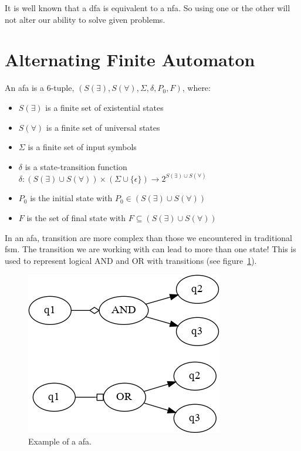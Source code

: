 \documentclass[12pt]{article}
\theoremstyle{definition}
\theoremstyle{definition}
\theoremstyle{remark}
\begin{document}
It is well known that a \gls{dfa} is equivalent to a \gls{nfa}. So using one or the other will not alter our ability to solve given problems.



\section{Alternating Finite Automaton}


An \gls{afa} is a 6-tuple, $(S(\exists), S(\forall), \Sigma, \delta, P_0, F)$, where:

\begin{itemize}
\item $S(\exists)$ is a finite set of existential states
\item $S(\forall)$ is a finite set of universal states
\item $\Sigma$ is a finite set of input symbols
\item $\delta$ is a state-transition function $\delta: (S(\exists) \cup S(\forall)) \times (\Sigma \cup \{ \epsilon \}) \rightarrow 2^{S(\exists) \cup S(\forall)}$
\item $P_0$ is the initial state with $P_0 \in (S(\exists) \cup S(\forall))$
\item $F$ is the set of final state with $F \subseteq (S(\exists) \cup S(\forall))$
\end{itemize}

In an \gls{afa}, transition are more complex than those we encountered in traditional \gls{fsm}. The transition we are working with can lead to more than one state! This is used to represent logical AND and OR with transitions (see figure~\ref{afa}).\\

\begin{figure}
    \centering
    \includegraphics[scale=0.8]{graph/afa.png}
    \caption{Example of a \gls{afa}.}
    \label{afa}
\end{figure}
\end{document}
